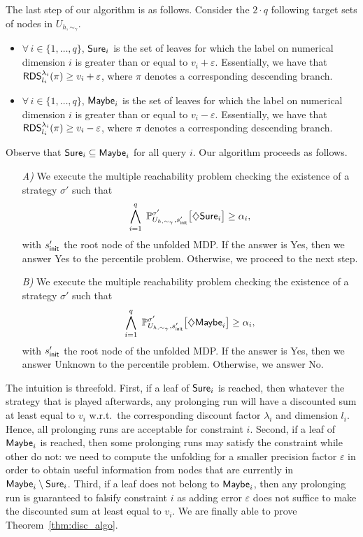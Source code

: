 \documentclass{llncs}
\newcommand{\initState}{\ensuremath{s_{{\sf init}}} }
\newcommand{\strat}{\ensuremath{\sigma} }
\newcommand*{\pr}{\mathbb{P}}
\newcommand{\discount}{\ensuremath{\lambda} }
\newcommand{\roundedDiscSum}[1]{\ensuremath{{\sf RDS}^{#1}} }
\begin{document}
The last step of our algorithm is as follows. Consider the $2\cdot q$ following target sets of nodes in $U_{h,\sim_{\gamma}}$.
\begin{itemize}
\item $\forall\, i \in \{1, \ldots{}, q\}$, ${\sf Sure}_{i}$ is the set of leaves for which the label on numerical dimension $i$ is greater than or equal to $v_{i} + \varepsilon$. Essentially, we have that $\roundedDiscSum{\discount_{i}}_{l_{i}}(\pi) \geq v_{i} + \varepsilon$, where $\pi$ denotes a corresponding descending branch.
\item $\forall\, i \in \{1, \ldots{}, q\}$, ${\sf Maybe}_{i}$ is the set of leaves for which the label on numerical dimension $i$ is greater than or equal to $v_{i} - \varepsilon$. Essentially, we have that $\roundedDiscSum{\discount_{i}}_{l_{i}}(\pi) \geq v_{i} - \varepsilon$, where $\pi$ denotes a corresponding descending branch.
\end{itemize}
Observe that ${\sf Sure}_{i} \subseteq {\sf Maybe}_{i}$ for all query $i$. Our algorithm proceeds as follows.
\begin{itemize}
\item[\textit{A)}] We execute the multiple reachability problem checking the existence of a strategy $\strat'$ such that
\begin{equation*}
\bigwedge_{i = 1}^{q}\; \pr_{U_{h,\sim_{\gamma}},\initState'}^{\strat'}\big[\diamondsuit {\sf Sure}_{i}\big] \geq
	\alpha_i,
\end{equation*}
with $\initState'$ the root node of the unfolded MDP. If the answer is \textsf{Yes}, then we answer \textsf{Yes} to the percentile problem. Otherwise, we proceed to the next step.
\item[\textit{B)}]  We execute the multiple reachability problem checking the existence of a strategy $\strat'$ such that 
\begin{equation*}
\bigwedge_{i = 1}^{q}\; \pr_{U_{h,\sim_{\gamma}},\initState'}^{\strat'}\big[\diamondsuit {\sf Maybe}_{i}\big] \geq
	\alpha_i,
\end{equation*}
with $\initState'$ the root node of the unfolded MDP. If the answer is \textsf{Yes}, then we answer \textsf{Unknown} to the percentile problem. Otherwise, we answer \textsf{No}.
\end{itemize}

The intuition is threefold. First, if a leaf of ${\sf Sure}_{i}$ is reached, then whatever the strategy that is played afterwards, any prolonging run will have a discounted sum at least equal to $v_{i}$ w.r.t.~the corresponding discount factor $\discount_{i}$ and dimension $l_{i}$. Hence, all prolonging runs are acceptable for constraint $i$. Second, if a leaf of ${\sf Maybe}_{i}$ is reached, then some prolonging runs may satisfy the constraint while other do not: we need to compute the unfolding for a smaller precision factor $\varepsilon$ in order to obtain useful information from nodes that are currently in ${\sf Maybe}_{i} \setminus {\sf Sure}_{i}$. Third, if a leaf does not belong to ${\sf Maybe}_{i}$, then any prolonging run is guaranteed to falsify constraint $i$ as adding error $\varepsilon$ does not suffice to make the discounted sum at least equal to $v_{i}$. We are finally able to prove Theorem~\ref{thm:disc_algo}.
\end{document}
